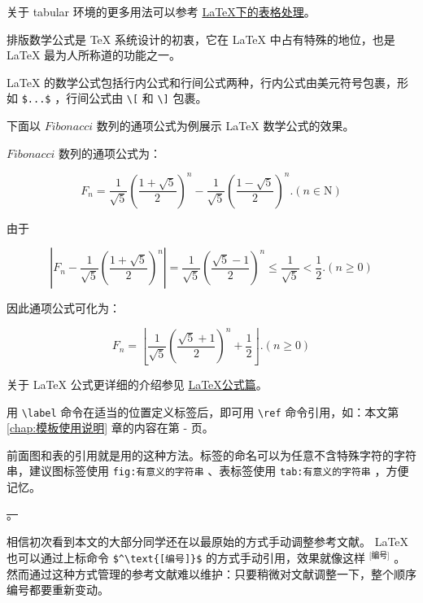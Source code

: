 关于 tabular 环境的更多用法可以参考 \href{https://zhuanlan.zhihu.com/p/19749566}{\LaTeX{}下的表格处理}。


排版数学公式是 \TeX{} 系统设计的初衷，它在 \LaTeX{} 中占有特殊的地位，也是 \LaTeX{} 最为人所称道的功能之一\cite{lhy_latex}。

\LaTeX{} 的数学公式包括行内公式和行间公式两种，行内公式由美元符号包裹，形如 \verb!$...$! ，行间公式由 \verb!\[! 和 \verb!\]! 包裹。

下面以 $Fibonacci$ 数列的通项公式为例展示 \LaTeX{} 数学公式的效果。

$Fibonacci$  数列的通项公式为：

\[
  F_n=\dfrac{1}{\sqrt{5}}\left( \dfrac{1+\sqrt{5}}{2}\right) ^{n}-\dfrac{1}{\sqrt{5}}\left( \dfrac{1-\sqrt{5}}{2}\right) ^{n}.(n\in \mathrm{N})​​​​​
\]

由于

\[
\left| F_{n}-\dfrac{1}{\sqrt{5}}\left( \dfrac{1+\sqrt{5}}{2}\right) ^{n}\right| =\dfrac{1}{\sqrt{5}}\left( \dfrac{\sqrt{5}-1}{2}\right) ^{n}\le \dfrac{1}{\sqrt{5}} <\dfrac 12.(n\ge 0)
\]

因此通项公式可化为：

\[
F_{n}=\left\lfloor \dfrac{1}{\sqrt{5}}\left( \dfrac{\sqrt{5}+1}{2}\right) ^{n}+\dfrac{1}{2}\right\rfloor.(n\ge 0)
\]

关于 \LaTeX{} 公式更详细的介绍参见 \href{https://zhuanlan.zhihu.com/p/110756681}{\LaTeX{}公式篇}。


用 \verb!\label! 命令在适当的位置定义标签后，即可用 \verb!\ref! 命令引用，如：本文第 \ref{chap:模板使用说明} 章的内容在第 \pageref{chap:模板使用说明} - \pageref{chap:模板使用说明:end} 页。

前面图和表的引用就是用的这种方法。标签的命名可以为任意不含特殊字符的字符串，建议图标签使用 \verb!fig:有意义的字符串! 、表标签使用 \verb!tab:有意义的字符串! ，方便记忆。


\sout{。}


相信初次看到本文的大部分同学还在以最原始的方式手动调整参考文献。 \LaTeX{} 也可以通过上标命令 \verb!$^\text{[编号]}$! 的方式手动引用，效果就像这样 $^\text{[编号]}$ 。然而通过这种方式管理的参考文献难以维护：只要稍微对文献调整一下，整个顺序编号都要重新变动。

